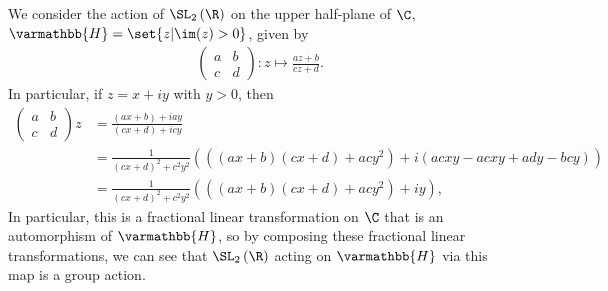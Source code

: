 \documentclass[10pt]{mypackage}
\renewcommand*{\mathbb}[1]{\varmathbb{#1}}
\begin{document}
\begin{solution}
  We consider the action of $\SL_{2}\left( \R \right)$ on the upper half-plane of $\C$, $ \mathbb{H} = \set{z | \im(z) > 0} $, given by
  \begin{align*}
    \begin{pmatrix}a & b \\ c & d\end{pmatrix}\colon z\mapsto \frac{az + b}{cz + d}.
  \end{align*}
  In particular, if $z = x + iy$ with $y > 0$, then
  \begin{align*}
    \begin{pmatrix}a & b \\ c & d\end{pmatrix} z &= \frac{\left( ax + b \right) + iay}{\left( cx + d \right) + icy}\\
                     &= \frac{1}{\left( cx + d \right)^2 + c^2y^2} \left( \left( \left( ax + b \right)\left( cx + d \right) + acy^2 \right) + i\left( acxy - acxy + ady - bcy \right) \right)\\
                     &= \frac{1}{\left( cx + d \right)^2 + c^2y^2}\left( \left( \left( ax + b \right)\left( cx + d \right) + acy^2 \right) + iy \right),
  \end{align*}
  In particular, this is a fractional linear transformation on $\C$ that is an automorphism of $ \mathbb{H} $, so by composing these fractional linear transformations, we can see that $\SL_2\left( \R \right)$ acting on $ \mathbb{H} $ via this map is a group action.\newline


\end{solution}
\end{document}
